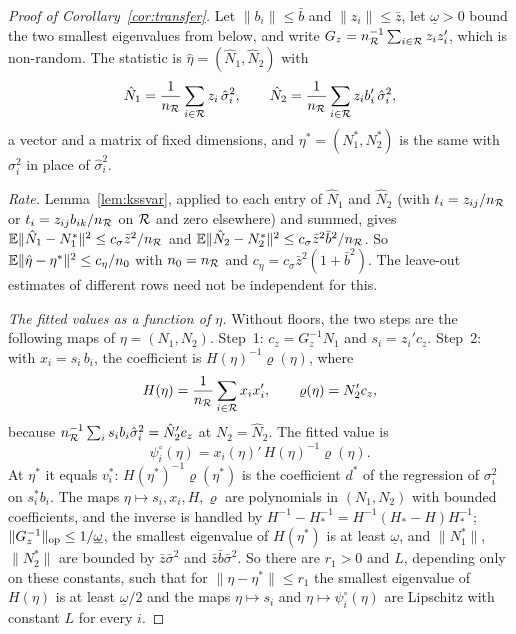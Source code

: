 \begin{proof}[Proof of Corollary~\ref{cor:transfer}]
Let $\|b_i\|\le\bar b$ and $\|z_i\|\le\bar z$, let $\underline\omega>0$ bound the two smallest eigenvalues from
below, and write $G_z=n_{\mathcal{R}}^{-1}\sum_{i\in\mathcal{R}}z_iz_i'$, which is non-random. The statistic is
$\hat\eta=(\hat N_1,\hat N_2)$ with
\[
\hat N_1=\frac{1}{n_{\mathcal{R}}}\sum_{i\in\mathcal{R}}z_i\,\hat\sigma_i^2,\qquad
\hat N_2=\frac{1}{n_{\mathcal{R}}}\sum_{i\in\mathcal{R}}z_ib_i'\,\hat\sigma_i^2,
\]
a vector and a matrix of fixed dimensions, and $\eta^*=(N_1^*,N_2^*)$ is the same with $\sigma_i^2$ in place of
$\hat\sigma_i^2$.

\emph{Rate.} Lemma~\ref{lem:kssvar}, applied to each entry of $\hat N_1$ and $\hat N_2$ (with $t_i=z_{ij}/n_{\mathcal{R}}$ or
$t_i=z_{ij}b_{ik}/n_{\mathcal{R}}$ on $\mathcal{R}$ and zero elsewhere) and summed, gives
$\mathbb{E}\|\hat N_1-N_1^*\|^2\le c_\sigma\bar z^2/n_{\mathcal{R}}$ and $\mathbb{E}\|\hat N_2-N_2^*\|^2\le c_\sigma\bar z^2\bar b^2/n_{\mathcal{R}}$. So
$\mathbb{E}\|\hat\eta-\eta^*\|^2\le c_\eta/n_0$ with $n_0=n_{\mathcal{R}}$ and $c_\eta=c_\sigma\bar z^2(1+\bar b^2)$. The leave-out
estimates of different rows need not be independent for this.

\emph{The fitted values as a function of $\eta$.} Without floors, the two steps are the following maps of
$\eta=(N_1,N_2)$. Step~1: $c_z=G_z^{-1}N_1$ and $s_i=z_i'c_z$. Step~2: with $x_i=s_i\,b_i$, the coefficient is
$H(\eta)^{-1}\varrho(\eta)$, where
\[
H(\eta)=\frac{1}{n_{\mathcal{R}}}\sum_{i\in\mathcal{R}}x_ix_i',\qquad \varrho(\eta)=N_2'c_z ,
\]
because $n_{\mathcal{R}}^{-1}\sum_is_ib_i\hat\sigma_i^2=\hat N_2'c_z$ at $N_2=\hat N_2$. The fitted value is
\[
\psi^\circ_i(\eta)=x_i(\eta)'\,H(\eta)^{-1}\varrho(\eta) .
\]
At $\eta^*$ it equals $v_i^*$: $H(\eta^*)^{-1}\varrho(\eta^*)$ is the coefficient $d^*$ of the regression of
$\sigma_i^2$ on $s_i^*b_i$. The maps $\eta\mapsto s_i,x_i,H,\varrho$ are polynomials in $(N_1,N_2)$ with bounded
coefficients, and the inverse is handled by $H^{-1}-H_*^{-1}=H^{-1}(H_*-H)H_*^{-1}$;
$\|G_z^{-1}\|_{\mathrm{op}}\le1/\underline\omega$, the smallest eigenvalue of $H(\eta^*)$ is at least $\underline\omega$, and
$\|N_1^*\|$, $\|N_2^*\|$ are bounded by $\bar z\bar\sigma^2$ and $\bar z\bar b\bar\sigma^2$. So there are $r_1>0$ and
$L$, depending only on these constants, such that for $\|\eta-\eta^*\|\le r_1$ the smallest eigenvalue of
$H(\eta)$ is at least $\underline\omega/2$ and the maps $\eta\mapsto s_i$ and $\eta\mapsto\psi^\circ_i(\eta)$ are
Lipschitz with constant $L$ for every $i$.


\end{proof}
